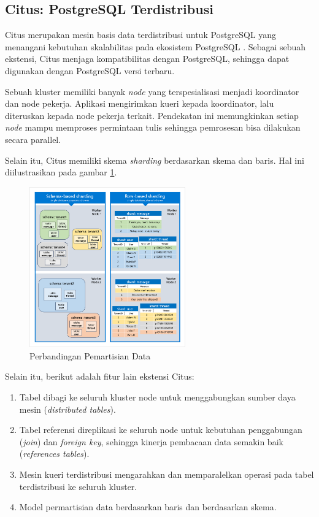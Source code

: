 \subsection{Citus: PostgreSQL Terdistribusi}

Citus merupakan mesin basis data terdistribusi untuk PostgreSQL yang menangani kebutuhan skalabilitas pada ekosistem PostgreSQL \parencite{citus}. Sebagai sebuah ekstensi, Citus menjaga kompatibilitas dengan PostgreSQL, sehingga dapat digunakan dengan PostgreSQL versi terbaru.

Sebuah kluster memiliki banyak \textit{node} yang terspesialisasi menjadi koordinator dan node pekerja. Aplikasi mengirimkan kueri kepada koordinator, lalu diteruskan kepada node pekerja terkait. Pendekatan ini memungkinkan setiap \textit{node} mampu memproses permintaan tulis sehingga pemrosesan bisa dilakukan secara parallel.

Selain itu, Citus memiliki skema \textit{sharding} berdasarkan skema dan baris. Hal ini diilustrasikan pada gambar \ref{fig:row-vs-schema-sharding}.

\begin{figure}[htbp]
    \centering
    \includegraphics[width=0.6\textwidth]{resources/chapter-2/row-vs-schema-sharding.png}
    \caption{Perbandingan Pemartisian Data \parencite{schemaBasedSharding}}
    \label{fig:row-vs-schema-sharding}
\end{figure}

Selain itu, berikut adalah fitur lain ekstensi Citus:

\begin{enumerate}
    \item Tabel dibagi ke seluruh kluster node untuk menggabungkan sumber daya mesin (\textit{distributed tables}).
    \item Tabel referensi direplikasi ke seluruh node untuk kebutuhan penggabungan (\textit{join}) dan \textit{foreign key}, sehingga kinerja pembacaan data semakin baik (\textit{references tables}).
    \item Mesin kueri terdistribusi mengarahkan dan memparalelkan operasi pada tabel terdistribusi ke seluruh kluster.
    \item Model permartisian data berdasarkan baris dan berdasarkan skema.
\end{enumerate}

